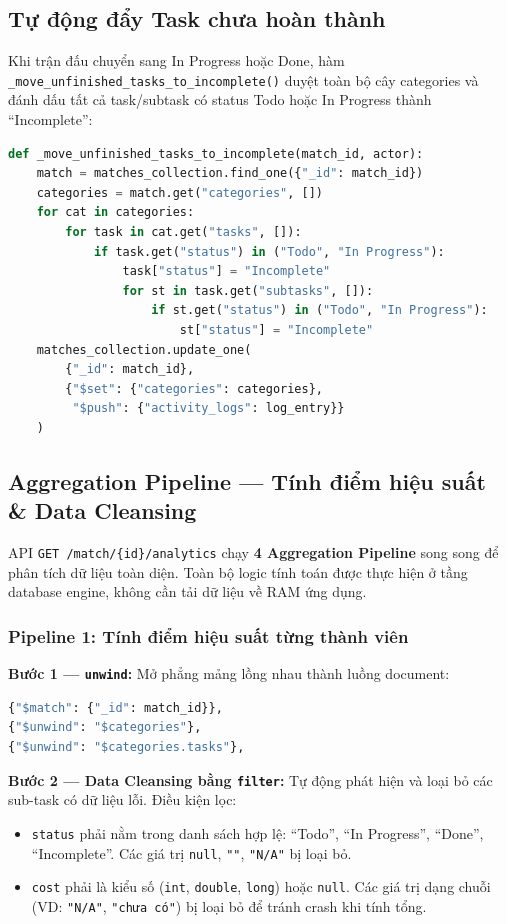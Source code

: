 \documentclass[a4paper,12pt]{article}
\begin{document}
\subsection{Tự động đẩy Task chưa hoàn thành}
Khi trận đấu chuyển sang In Progress hoặc Done, hàm \texttt{\_move\_unfinished\_tasks\_to\_incomplete()} duyệt toàn bộ cây categories và đánh dấu tất cả task/subtask có status Todo hoặc In Progress thành ``Incomplete'':

\begin{lstlisting}[language=Python, caption=Tự động đánh dấu task chưa hoàn thành]
def _move_unfinished_tasks_to_incomplete(match_id, actor):
    match = matches_collection.find_one({"_id": match_id})
    categories = match.get("categories", [])
    for cat in categories:
        for task in cat.get("tasks", []):
            if task.get("status") in ("Todo", "In Progress"):
                task["status"] = "Incomplete"
                for st in task.get("subtasks", []):
                    if st.get("status") in ("Todo", "In Progress"):
                        st["status"] = "Incomplete"
    matches_collection.update_one(
        {"_id": match_id},
        {"$set": {"categories": categories},
         "$push": {"activity_logs": log_entry}}
    )
\end{lstlisting}


\subsection{Aggregation Pipeline --- Tính điểm hiệu suất \& Data Cleansing}

API \texttt{GET /match/\{id\}/analytics} chạy \textbf{4 Aggregation Pipeline} song song để phân tích dữ liệu toàn diện. Toàn bộ logic tính toán được thực hiện ở tầng database engine, không cần tải dữ liệu về RAM ứng dụng.

\subsubsection{Pipeline 1: Tính điểm hiệu suất từng thành viên}

\textbf{Bước 1 --- \texttt{unwind}:} Mở phẳng mảng lồng nhau thành luồng document:
\begin{lstlisting}[language=Python, caption=Unwind categories và tasks]
{"$match": {"_id": match_id}},
{"$unwind": "$categories"},
{"$unwind": "$categories.tasks"},
\end{lstlisting}

\textbf{Bước 2 --- Data Cleansing bằng \texttt{filter}:} Tự động phát hiện và loại bỏ các sub-task có dữ liệu lỗi. Điều kiện lọc:
\begin{itemize}
    \item \texttt{status} phải nằm trong danh sách hợp lệ: ``Todo'', ``In Progress'', ``Done'', ``Incomplete''. Các giá trị \texttt{null}, \texttt{""}, \texttt{"N/A"} bị loại bỏ.
    \item \texttt{cost} phải là kiểu số (\texttt{int}, \texttt{double}, \texttt{long}) hoặc \texttt{null}. Các giá trị dạng chuỗi (VD: \texttt{"N/A"}, \texttt{"chưa có"}) bị loại bỏ để tránh crash khi tính tổng.
\end{itemize}
\end{document}

